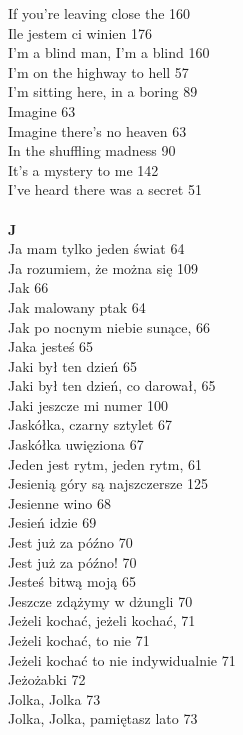 \documentclass[a5paper, 10pt]{book}
\begin{document}
{\begin{multicols}{3}
    If you're leaving close the 160\\
    Ile jestem ci winien 176\\
    I'm a blind man, I'm a blind 160\\
    I'm on the highway to hell 57\\
    I'm sitting here, in a boring 89\\
    Imagine 63\\
    Imagine there's no heaven 63\\
    In the shuffling madness 90\\
    It's a mystery to me 142\\
    I've heard there was a secret 51\\
    \\
    {\footnotesize \textbf{J\\} }
    Ja mam tylko jeden świat 64\\
    Ja rozumiem, że można się 109\\
    Jak 66\\
    Jak malowany ptak 64\\
    Jak po nocnym niebie sunące, 66\\
    Jaka jesteś 65\\
    Jaki był ten dzień 65\\
    Jaki był ten dzień, co darował, 65\\
    Jaki jeszcze mi numer 100\\
    Jaskółka, czarny sztylet 67\\
    Jaskółka uwięziona 67\\
    Jeden jest rytm, jeden rytm, 61\\
    Jesienią góry są najszczersze 125\\
    Jesienne wino 68\\
    Jesień idzie 69\\
    Jest już za późno 70\\
    Jest już za późno! 70\\
    Jesteś bitwą moją 65\\
    Jeszcze zdążymy w dżungli 70\\
    Jeżeli kochać, jeżeli kochać, 71\\
    Jeżeli kochać, to nie 71\\
    Jeżeli kochać to nie indywidualnie 71\\
    Jeżożabki 72\\
    Jolka, Jolka 73\\
    Jolka, Jolka, pamiętasz lato 73\\

\end{multicols}}
\end{document}
